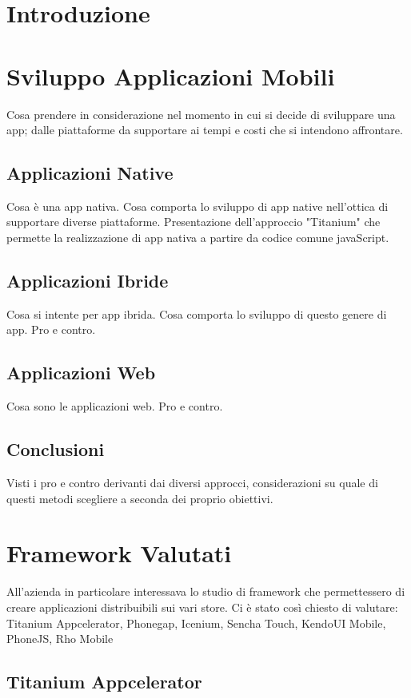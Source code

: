 \chapter{Introduzione}

\chapter{Sviluppo Applicazioni Mobili}
	Cosa prendere in considerazione nel momento in cui si decide di sviluppare
	una app; dalle piattaforme da supportare ai tempi e costi che si intendono
	affrontare.
	
	\section{Applicazioni Native}
		Cosa è una app nativa. Cosa comporta lo sviluppo di app native nell'ottica
		di supportare diverse piattaforme. Presentazione dell'approccio "Titanium" che
		permette la realizzazione di app nativa a partire da codice comune javaScript.
		
	\section{Applicazioni Ibride}
		Cosa si intente per app ibrida. Cosa comporta lo sviluppo di questo genere
		di app. Pro e contro.
		
	\section{Applicazioni Web}
		Cosa sono le applicazioni web. Pro e contro.
		
	\section{Conclusioni}
		Visti i pro e contro derivanti dai diversi approcci, considerazioni su
		quale di questi metodi scegliere a seconda dei proprio obiettivi.
		
		
\chapter{Framework Valutati}
	All'azienda in particolare interessava lo studio di framework che permettessero di creare 		    applicazioni distribuibili sui vari store. Ci è stato così chiesto di valutare: 
	Titanium Appcelerator, Phonegap, Icenium, Sencha Touch, KendoUI Mobile, PhoneJS, Rho Mobile
	
	\section{Titanium Appcelerator}
